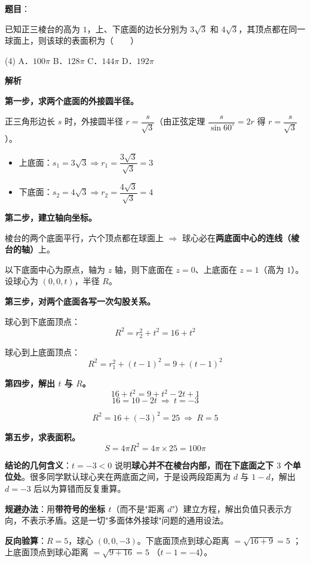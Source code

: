 \begin{answer}

\textbf{题目}：

已知正三棱台的高为 $1$，上、下底面的边长分别为 $3\sqrt3$ 和 $4\sqrt3$，其顶点都在同一球面上，则该球的表面积为\mbox{（　　）}

\begin{gkopts}(4)
\task A．$100\pi$
\task B．$128\pi$
\task C．$144\pi$
\task D．$192\pi$
\end{gkopts}

\textbf{解析}

\textbf{第一步，求两个底面的外接圆半径。}

正三角形边长 $s$ 时，外接圆半径 $r=\dfrac s{\sqrt3}$（由正弦定理 $\dfrac s{\sin60^\circ}=2r$ 得 $r=\dfrac s{\sqrt3}$）。

\begin{itemize}
\item 上底面：$s_1=3\sqrt3\Rightarrow r_1=\dfrac{3\sqrt3}{\sqrt3}=3$
\item 下底面：$s_2=4\sqrt3\Rightarrow r_2=\dfrac{4\sqrt3}{\sqrt3}=4$
\end{itemize}

\textbf{第二步，建立轴向坐标。}

棱台的两个底面平行，六个顶点都在球面上 $\Rightarrow$ 球心必在\textbf{两底面中心的连线（棱台的轴）}上。

以下底面中心为原点，轴为 $z$ 轴，则下底面在 $z=0$、上底面在 $z=1$（高为 $1$）。设球心为 $(0,0,t)$，半径 $R$。

\textbf{第三步，对两个底面各写一次勾股关系。}

球心到下底面顶点：
\nopagebreak[4]
\[R^{2}=r_2^{2}+t^{2}=16+t^{2}\]

球心到上底面顶点：
\nopagebreak[4]
\[R^{2}=r_1^{2}+(t-1)^{2}=9+(t-1)^{2}\]

\textbf{第四步，解出 $t$ 与 $R$。}
\nopagebreak[4]
\[16+t^{2}=9+t^{2}-2t+1\]
\nopagebreak[4]
\[16=10-2t\ \Longrightarrow\ t=-3\]

\nopagebreak[4]
\[R^{2}=16+(-3)^{2}=25\ \Longrightarrow\ R=5\]

\textbf{第五步，求表面积。}
\nopagebreak[4]
\[S=4\pi R^{2}=4\pi\times25=100\pi\]

\begin{gktip}
\textbf{结论的几何含义}：$t=-3<0$ 说明\textbf{球心并不在棱台内部，而在下底面之下 $3$ 个单位处}。很多同学默认球心夹在两底面之间，于是设两段距离为 $d$ 与 $1-d$，解出 $d=-3$ 后以为算错而反复重算。

\textbf{规避办法}：用\textbf{带符号的坐标 $t$}（而不是"距离 $d$"）建立方程，解出负值只表示方向，不表示矛盾。这是一切"多面体外接球"问题的通用设法。

\textbf{反向验算}：$R=5$，球心 $(0,0,-3)$。下底面顶点到球心距离 $=\sqrt{16+9}=5$ ；上底面顶点到球心距离 $=\sqrt{9+16}=5$ （$t-1=-4$）。
\end{gktip}


\par\medskip

\end{answer}
